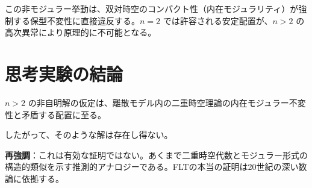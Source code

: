\documentclass[dvipdfmx,a4paper]{article}
\begin{document}
この非モジュラー挙動は、双対時空のコンパクト性（内在モジュラリティ）が強制する保型不変性に直接違反する。$n=2$ では許容される安定配置が、$n > 2$ の高次異常により原理的に不可能となる。

\section{思考実験の結論}

$n>2$ の非自明解の仮定は、離散モデル内の二重時空理論の内在モジュラー不変性と矛盾する配置に至る。

したがって、そのような解は存在し得ない。

\textbf{再強調}：これは有効な証明ではない。あくまで二重時空代数とモジュラー形式の構造的類似を示す推測的アナロジーである。FLTの本当の証明は20世紀の深い数論に依拠する。
\end{document}
